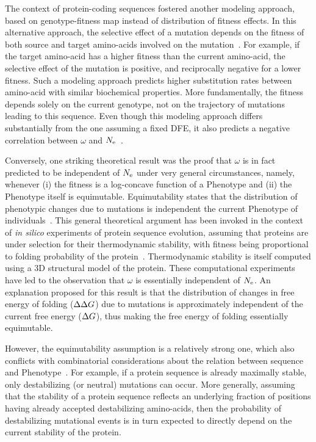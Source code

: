 The context of protein-coding sequences fostered another modeling approach, based on genotype-fitness map instead of distribution of fitness effects.
In this alternative approach, the selective effect of a mutation depends on the fitness of both source and target amino-acids involved on the mutation~\citep{Halpern1998, Rodrigue2010, Tamuri2012}.
For example, if the target amino-acid has a higher fitness than the current amino-acid, the selective effect of the mutation is positive, and reciprocally negative for a lower fitness.
Such a modeling approach predicts higher \gls{substitution} rates between amino-acid with similar biochemical properties.
More fundamentally, the fitness depends solely on the current genotype, not on the trajectory of mutations leading to this sequence.
Even though this modeling approach differs substantially from the one assuming a fixed \acrshort{DFE}, it also predicts a negative correlation between $\omega$ and $N_{\mathrm{e}}$~\citep{Spielman2015, DosReis2015}.

Conversely, one striking theoretical result was the proof that $\omega$ is in fact predicted to be independent of $N_{\mathrm{e}}$ under very general circumstances, namely, whenever (i) the fitness is a log-concave function of a \gls{Phenotype} and (ii) the \gls{Phenotype} itself is equimutable.
Equimutability states that the distribution of phenotypic changes due to mutations is independent the current \gls{Phenotype} of individuals~\citep{Cherry1998}.
This general theoretical argument has been invoked in the context of \textit{in silico} experiments of protein sequence evolution, assuming that proteins are under selection for their thermodynamic stability, with fitness being proportional to  folding probability of the protein~\citep{Goldstein2013}.
Thermodynamic stability is itself computed using a 3D structural model of the protein. These computational experiments have led to the observation that $\omega$ is essentially independent of $N_{\mathrm{e}}$.
An explanation proposed for this result is that the distribution of changes in free energy of folding ($\Delta \Delta G$) due to mutations is approximately independent of the current free energy ($\Delta G$), thus making the free energy of folding essentially equimutable.

However, the equimutability assumption is a relatively strong one, which also conflicts with combinatorial considerations about the relation between sequence and \gls{Phenotype}~\citep{Serohijos2012}.
For example, if a protein sequence is already maximally stable, only destabilizing (or neutral) mutations can occur.
More generally, assuming that the stability of a protein sequence reflects an underlying fraction of positions having already accepted destabilizing amino-acids, then the probability of destabilizing mutational events is in turn expected to directly depend on the current stability of the protein.

